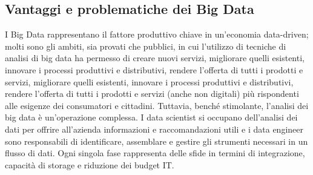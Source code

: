 \subsection{Vantaggi e problematiche dei Big Data}

I Big Data rappresentano il fattore produttivo chiave in un'economia data-driven; molti sono gli ambiti, sia provati che pubblici, in cui l'utilizzo di tecniche di analisi di big data ha permesso di creare nuovi servizi, migliorare quelli esistenti, innovare i processi produttivi e distributivi, rendere l'offerta di tutti i prodotti e servizi, migliorare quelli esistenti, innovare i processi produttivi e distributivi, rendere l'offerta di tutti i prodotti e servizi (anche non digitali) più rispondenti alle esigenze dei consumatori e cittadini. Tuttavia, benché stimolante, l'analisi dei big data è un'operazione complessa. I data scientist si occupano dell'analisi dei dati per offrire all'azienda informazioni e raccomandazioni utili e i data engineer sono responsabili di identificare, assemblare e gestire gli strumenti necessari in un flusso di dati. Ogni singola fase rappresenta delle sfide in termini di integrazione, capacità di storage e riduzione dei budget IT.\cite{redhat_big_data}

